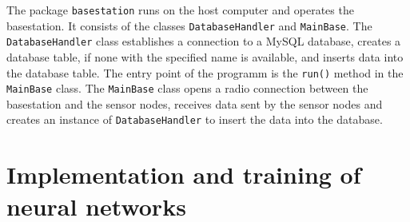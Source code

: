 \documentclass[12pt,a4paper]{scrartcl}
\begin{document}
The package \texttt{basestation} runs on the host computer and operates the basestation.
It consists of the classes \texttt{Database\-Handler} and \texttt{MainBase}.
The \texttt{Database\-Handler} class establishes a connection to a MySQL database, creates a database table, if none with the specified name is available, and inserts data into the database table.
The entry point of the programm is the \texttt{run()} method in the \texttt{MainBase} class. The \texttt{MainBase} class opens a radio connection between the basestation and the sensor nodes, receives data sent by the sensor nodes and creates an instance of \texttt{Database\-Handler} to insert the data into the database.



%

\newpage


\section*{Implementation and training of neural networks}
\end{document}
